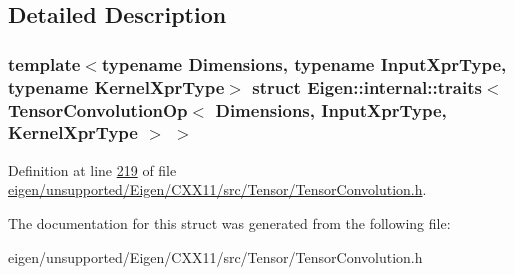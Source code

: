 \subsection{Detailed Description}
\subsubsection*{template$<$typename Dimensions, typename Input\+Xpr\+Type, typename Kernel\+Xpr\+Type$>$\newline
struct Eigen\+::internal\+::traits$<$ Tensor\+Convolution\+Op$<$ Dimensions, Input\+Xpr\+Type, Kernel\+Xpr\+Type $>$ $>$}



Definition at line \hyperlink{eigen_2unsupported_2_eigen_2_c_x_x11_2src_2_tensor_2_tensor_convolution_8h_source_l00219}{219} of file \hyperlink{eigen_2unsupported_2_eigen_2_c_x_x11_2src_2_tensor_2_tensor_convolution_8h_source}{eigen/unsupported/\+Eigen/\+C\+X\+X11/src/\+Tensor/\+Tensor\+Convolution.\+h}.



The documentation for this struct was generated from the following file\+:\begin{DoxyCompactItemize}
\item 
eigen/unsupported/\+Eigen/\+C\+X\+X11/src/\+Tensor/\+Tensor\+Convolution.\+h\end{DoxyCompactItemize}
